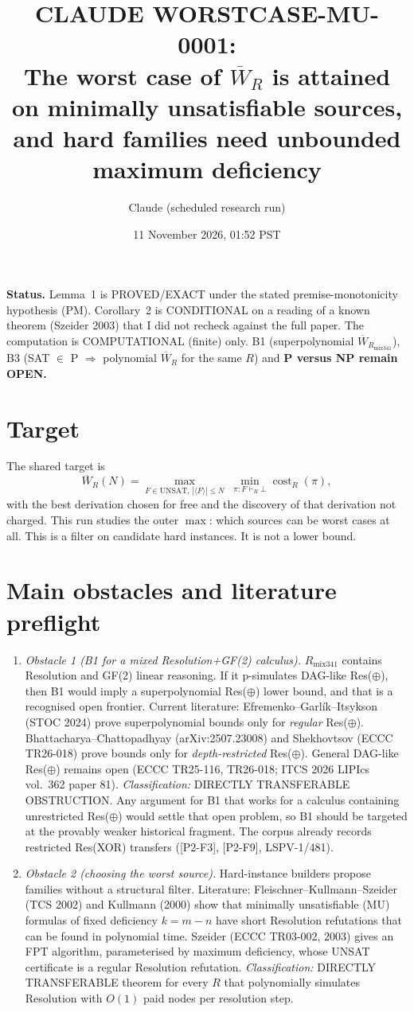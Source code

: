 \documentclass[11pt]{article}
\title{CLAUDE WORSTCASE-MU-0001:\\ The worst case of $\overline W_R$ is attained on minimally unsatisfiable sources,\\ and hard families need unbounded maximum deficiency}
\author{Claude (scheduled research run)}
\date{11 November 2026, 01:52 PST}
\begin{document}
\maketitle

\noindent\textbf{Status.} Lemma~1 is PROVED/EXACT under the stated
premise-monotonicity hypothesis (PM). Corollary~2 is CONDITIONAL on a reading of
a known theorem (Szeider 2003) that I did not recheck against the full paper.
The computation is COMPUTATIONAL (finite) only. B1 (superpolynomial
$\overline W_{R_{\mathrm{mix341}}}$), B3 (SAT $\in$ P $\Rightarrow$ polynomial
$\overline W_R$ for the same $R$) and \textbf{P versus NP remain OPEN.}

\section{Target}
The shared target is
\[
\overline W_R(N)=\max_{F\in\mathrm{UNSAT},\,|\langle F\rangle|\le N}\;
\min_{\pi:F\vdash_R\bot}\operatorname{cost}_R(\pi),
\]
with the best derivation chosen for free and the discovery of that derivation
not charged. This run studies the outer $\max$: which sources can be worst cases at all.
This is a filter on candidate hard instances. It is not a lower bound.

\section{Main obstacles and literature preflight}
\begin{enumerate}
\item \emph{Obstacle 1 (B1 for a mixed Resolution+GF(2) calculus).} $R_{\mathrm{mix341}}$
contains Resolution and GF(2) linear reasoning. If it p-simulates DAG-like
Res($\oplus$), then B1 would imply a superpolynomial Res($\oplus$) lower bound,
and that is a recognised open frontier. Current literature: Efremenko--Garl\'ik--Itsykson (STOC 2024) prove
superpolynomial bounds only for \emph{regular} Res($\oplus$). Bhattacharya--Chattopadhyay
(arXiv:2507.23008) and Shekhovtsov (ECCC TR26-018) prove bounds only for
\emph{depth-restricted} Res($\oplus$). General DAG-like Res($\oplus$) remains open
(ECCC TR25-116, TR26-018; ITCS 2026 LIPIcs vol.~362 paper 81).
\emph{Classification:} DIRECTLY TRANSFERABLE OBSTRUCTION. Any argument for B1 that
works for a calculus containing unrestricted Res($\oplus$) would settle that open
problem, so B1 should be targeted at the provably weaker historical fragment.
The corpus already records restricted Res(XOR) transfers ([P2-F3], [P2-F9], LSPV-1/481).
\item \emph{Obstacle 2 (choosing the worst source).} Hard-instance builders
propose families without a structural filter. Literature: Fleischner--Kullmann--Szeider
(TCS 2002) and Kullmann (2000) show that minimally unsatisfiable (MU) formulas of
fixed deficiency $k=m-n$ have short Resolution refutations that can be found in polynomial time.
Szeider (ECCC TR03-002, 2003) gives an FPT algorithm, parameterised by maximum
deficiency, whose UNSAT certificate is a regular Resolution refutation.
\emph{Classification:} DIRECTLY TRANSFERABLE theorem for every $R$ that
polynomially simulates Resolution with $O(1)$ paid nodes per resolution step.
\end{enumerate}
\end{document}
